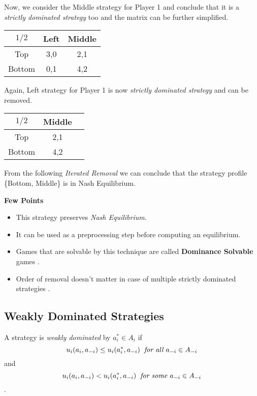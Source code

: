 Now, we consider the Middle strategy for Player 1 and conclude that it is a  \textit{strictly dominated strategy} too and the matrix can be further simplified.

		\begin{center}
		\begin{tabular}{|c|c|c|}\hline
		$1/2$ & Left & Middle \\ \hline
		Top &  3,0 & 2,1   \\ \hline
		Bottom & 0,1 & 4,2 \\ \hline
		\end{tabular}
		\end{center}
		
Again, Left strategy for Player 1 is now  \textit{strictly dominated strategy} and can be removed. 
		\begin{center}
		\begin{tabular}{|c|c|c|}\hline
		$1/2$ & Middle \\ \hline
		Top  & 2,1   \\ \hline
		Bottom & 4,2 \\ \hline
		\end{tabular}
		\end{center}

From the following \textit{Iterated Removal} we can conclude that the strategy profile \{Bottom, Middle\} is in Nash Equilibrium.

\begin{flushleft}\textbf{Few Points}\end{flushleft}
\begin{itemize}
\item This strategy preserves \textit{Nash Equilibrium}.
\item It can be used as a preprocessing step before computing an equilibrium.
\item Games that are solvable by this technique are called \textbf{Dominance Solvable} games .
\item Order of removal doesn't matter in case of multiple strictly dominated strategies .
\end{itemize}

\subsection{Weakly Dominated Strategies}
A strategy is \textit{weakly dominated} by $a_i^* \in A_i$ if $$u_i(a_i, a_{-i}) \leq u_i(a_i^*, a_{-i}) \hspace{0.2cm} \textit{for all }  a_{-i} \in A_{-i}$$ and $$u_i(a_i, a_{-i}) < u_i(a_i^*, a_{-i}) \hspace{0.2cm} \textit{for some } a_{-i} \in A_{-i}$$.

